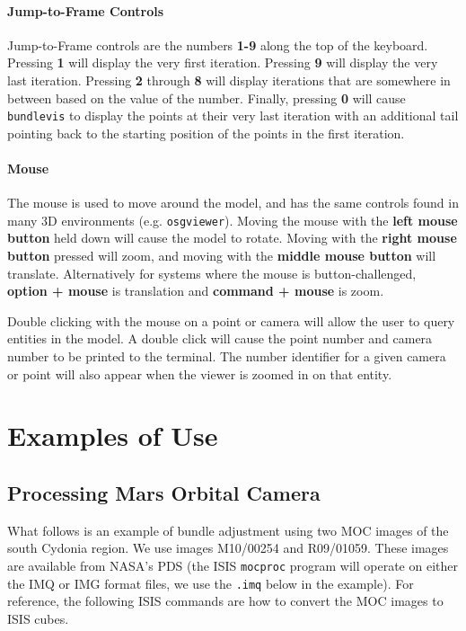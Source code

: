 \paragraph{Jump-to-Frame Controls}
Jump-to-Frame controls are the numbers \textbf{1-9} along the top of
the keyboard. Pressing \textbf{1} will display the very first
iteration. Pressing \textbf{9} will display the very last
iteration. Pressing \textbf{2} through \textbf{8} will display
iterations that are somewhere in between based on the value of the
number. Finally, pressing \textbf{0} will cause \texttt{bundlevis} to
display the points at their very last iteration with an additional
tail pointing back to the starting position of the points in the first
iteration.

\paragraph{Mouse}
The mouse is used to move around the model, and has the same controls
found in many 3D environments (e.g. \texttt{osgviewer}). Moving the
mouse with the \textbf{left mouse button} held down will cause the
model to rotate.  Moving with the \textbf{right mouse button} pressed
will zoom, and moving with the \textbf{middle mouse button} will
translate. Alternatively for systems where the mouse is
button-challenged, \textbf{option + mouse} is translation and
\textbf{command + mouse} is zoom.

Double clicking with the mouse on a point or camera will allow the
user to query entities in the model.  A double click will cause the
point number and camera number to be printed to the terminal. The
number identifier for a given camera or point will also appear when
the viewer is zoomed in on that entity.

\section{Examples of Use}

\subsection{Processing Mars Orbital Camera}

What follows is an example of bundle adjustment using two \ac{MOC}
images of the south Cydonia region. We use images M10/00254 and
R09/01059. These images are available from NASA's \ac{PDS} (the
\ac{ISIS} \texttt{mocproc} program will operate on either the IMQ
or IMG format files, we use the \texttt{.imq} below in the example).
For reference, the following \ac{ISIS} commands are how to convert
the \ac{MOC} images to \ac{ISIS} cubes.

